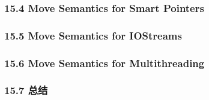 \documentclass[11pt,a4paper,UTF8]{ctexart}
\begin{document}
		\subsubsection{15.4 Move Semantics for Smart Pointers}
		\subsubsection{15.5 Move Semantics for IOStreams}
		\subsubsection{15.6 Move Semantics for Multithreading}
		\subsubsection{15.7 总结}
\end{document}
